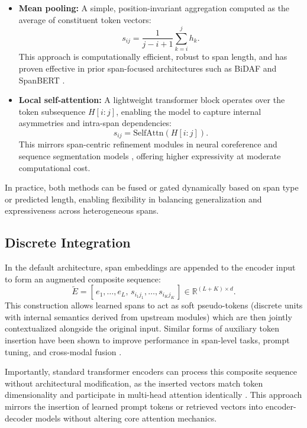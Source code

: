 \begin{itemize}
  \item \textbf{Mean pooling:} A simple, position-invariant aggregation computed as the average of constituent token vectors:
  \[
    s_{ij} = \frac{1}{j - i + 1} \sum_{k=i}^{j} h_k.
  \]
  This approach is computationally efficient, robust to span length, and has proven effective in prior span-focused architectures such as BiDAF and SpanBERT \cite{joshi2020spanbert, lee2017end}.

  \item \textbf{Local self-attention:} A lightweight transformer block operates over the token subsequence \(H[i{:}j]\), enabling the model to capture internal asymmetries and intra-span dependencies:
  \[
    s_{ij} = \mathrm{SelfAttn}(H[i{:}j]).
  \]
  This mirrors span-centric refinement modules in neural coreference and sequence segmentation models \cite{lee2018higher, tay2021charformer}, offering higher expressivity at moderate computational cost.
\end{itemize}

In practice, both methods can be fused or gated dynamically based on span type or predicted length, enabling flexibility in balancing generalization and expressiveness across heterogeneous spans.

\subsection{Discrete Integration}

In the default architecture, span embeddings are appended to the encoder input to form an augmented composite sequence:
\[
  \tilde{E} = [\, e_1, \dots, e_L,\, s_{i_1j_1}, \dots, s_{i_K j_K} \,] \in \mathbb{R}^{(L+K) \times d}.
\]
This construction allows learned spans to act as soft pseudo-tokens (discrete units with internal semantics derived from upstream modules) which are then jointly contextualized alongside the original input. Similar forms of auxiliary token insertion have been shown to improve performance in span-level tasks, prompt tuning, and cross-modal fusion \cite{guu2020retrieval, li2021prefix, zuo2022rethinking}.

Importantly, standard transformer encoders can process this composite sequence without architectural modification, as the inserted vectors match token dimensionality and participate in multi-head attention identically \cite{devlin2019bert, raffel2020t5, guu2020retrieval}. This approach mirrors the insertion of learned prompt tokens or retrieved vectors into encoder-decoder models without altering core attention mechanics.

